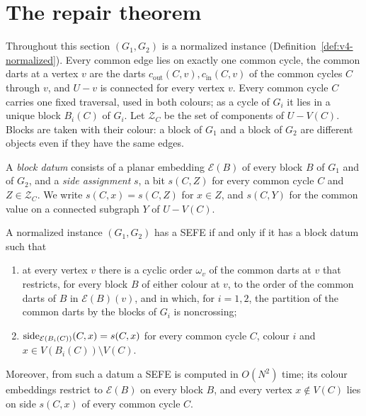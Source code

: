 \section{The repair theorem}\label{sec:v4-repair}

Throughout this section $(G_1,G_2)$ is a normalized instance
(Definition~\ref{def:v4-normalized}). Every common edge lies on exactly one
common cycle, the common darts at a vertex $v$ are the darts
$c_{\mathrm{out}}(C,v),c_{\mathrm{in}}(C,v)$ of the common cycles $C$ through
$v$, and $U-v$ is connected for every vertex $v$. Every common cycle $C$
carries one fixed traversal, used in both colours; as a cycle of $G_i$ it
lies in a unique block $B_i(C)$ of $G_i$. Let $\mathcal Z_C$ be the set of
components of $U-V(C)$. Blocks are taken with their colour: a block of $G_1$
and a block of $G_2$ are different objects even if they have the same edges.

\begin{definition}\label{def:v4-datum}
A \emph{block datum} consists of a planar embedding $\mathcal E(B)$ of every
block $B$ of $G_1$ and of $G_2$, and a \emph{side assignment} $s$, a bit
$s(C,Z)$ for every common cycle $C$ and $Z\in\mathcal Z_C$. We write
$s(C,x)=s(C,Z)$ for $x\in Z$, and $s(C,Y)$ for the common value on a
connected subgraph $Y$ of $U-V(C)$.
\end{definition}

\begin{theorem}[repair]\label{thm:v4-repair}
A normalized instance $(G_1,G_2)$ has a SEFE if and only if it has a block
datum such that
\begin{enumerate}[label=(R\arabic*),leftmargin=3em]
\item\label{it:v4-R1} at every vertex $v$ there is a cyclic order $\omega_v$
of the common darts at $v$ that restricts, for every block $B$ of either
colour at $v$, to the order of the common darts of $B$ in $\mathcal E(B)(v)$,
and in which, for $i=1,2$, the partition of the common darts by the blocks
of $G_i$ is noncrossing;
\item\label{it:v4-R2} $\operatorname{side}_{\mathcal E(B_i(C))}(C,x)=s(C,x)$ for every
common cycle $C$, colour $i$ and $x\in V(B_i(C))\setminus V(C)$.
\end{enumerate}
Moreover, from such a datum a SEFE is computed in $O(N^2)$ time; its colour
embeddings restrict to $\mathcal E(B)$ on every block $B$, and every vertex
$x\notin V(C)$ lies on side $s(C,x)$ of every common cycle $C$.
\end{theorem}

